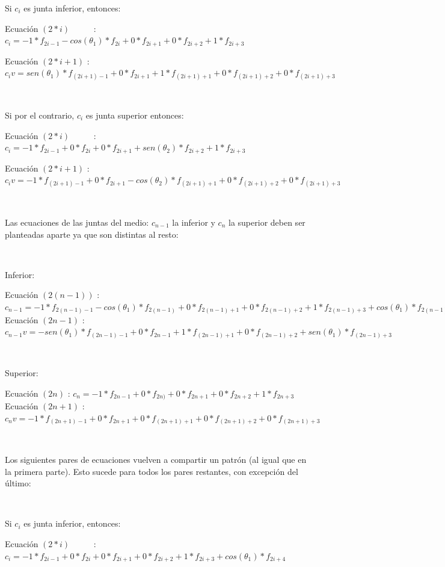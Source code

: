 Si $c_{i}$ es junta inferior, entonces:

Ecuación $(2*i)$ \ \ \ \ \  : $c_{i} = -1*f_{2i-1} - cos(\theta_{1})*f_{2i} + 0*f_{2i+1} + 0*f_{2i+2} + 1*f_{2i+3}$   

Ecuación $(2*i+1)$ : $c_{i} v = sen(\theta_{1})*f_{(2i+1)-1} + 0*f_{2i+1} + 1*f_{(2i+1)+1} + 0*f_{(2i+1)+2} + 0*f_{(2i+1)+3}$

~

Si por el contrario, $c_{i}$ es junta superior entonces:

Ecuación $(2*i)$ \ \ \ \ \  : $c_{i} = -1*f_{2i-1} + 0*f_{2i} + 0*f_{2i+1} + sen(\theta_{2})*f_{2i+2} + 1*f_{2i+3}$   

Ecuación $(2*i+1)$ : $c_{i} v = -1*f_{(2i+1)-1} + 0*f_{2i+1} - cos(\theta_{2})*f_{(2i+1)+1} + 0*f_{(2i+1)+2} + 0*f_{(2i+1)+3}$

~

Las ecuaciones de las juntas del medio: $c_{n-1}$ la inferior y $c_{n}$ la superior deben ser planteadas aparte ya que son distintas al resto:

~

Inferior:

Ecuación $(2(n-1))$ : $c_{n-1} = -1*f_{2(n-1)-1} - cos(\theta_{1})*f_{2(n-1)} + 0*f_{2(n-1)+1} + 0*f_{2(n-1)+2} + 1*f_{2(n-1)+3} + cos(\theta_{1})*f_{2(n-1)+4}$ \\  

Ecuación $(2n-1)$ : $c_{n-1} v = -sen(\theta_{1})*f_{(2n-1)-1} + 0*f_{2n-1} + 1*f_{(2n-1)+1} + 0*f_{(2n-1)+2} + sen(\theta_{1})*f_{(2n-1)+3}$

~

Superior:

Ecuación $(2n)$ : $c_{n} = -1*f_{2n-1} + 0*f_{2n)} + 0*f_{2n+1} + 0*f_{2n+2} + 1*f_{2n+3}$ \\  

Ecuación $(2n+1)$ : $c_{n} v = -1*f_{(2n+1)-1} + 0*f_{2n+1} + 0*f_{(2n+1)+1} + 0*f_{(2n+1)+2} + 0*f_{(2n+1)+3}$

~

Los siguientes pares de ecuaciones vuelven a compartir un patrón (al igual que en la primera parte). Esto sucede para todos los pares restantes, con excepción del último:  

~

Si $c_{i}$ es junta inferior, entonces:

Ecuación $(2*i)$ \ \ \ \ \  : $c_{i} = -1*f_{2i-1} + 0*f_{2i} + 0*f_{2i+1} + 0*f_{2i+2} + 1*f_{2i+3} + cos(\theta_{1})*f_{2i+4}$   

